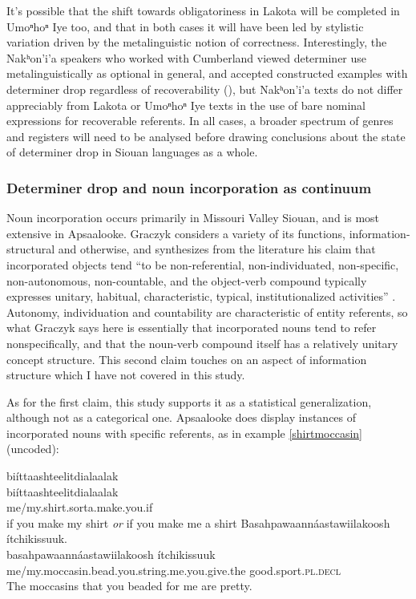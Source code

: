 \documentclass[output=paper]{LSP/langsci}
\begin{document}
	It’s possible that the shift towards obligatoriness in Lakota will be completed in Umoⁿhoⁿ Iye too, and that in both cases it will have been led by stylistic variation driven by the metalinguistic notion of correctness. Interestingly, the Nakʰon’i’a speakers who worked with Cumberland viewed determiner use metalinguistically as optional in general, and accepted constructed examples with determiner drop regardless of recoverability (\citealt[345]{Cumberland2005}), but Nakʰon’i’a texts do not differ appreciably from Lakota or Umoⁿhoⁿ Iye texts in the use of bare nominal expressions for recoverable referents. In all cases, a broader spectrum of genres and registers will need to be analysed before drawing conclusions about the state of determiner drop in Siouan languages as a whole.

\subsubsection{Determiner drop and noun incorporation as continuum}\label{dropincorp}

Noun incorporation occurs primarily in Missouri Valley Siouan, and is most extensive in Apsaalooke. Graczyk considers a variety of its functions, information-structural and otherwise, and synthesizes from the literature his claim that incorporated objects tend “to be non-referential, non-individuated, non-specific, non-autonomous, non-countable, and the object-verb compound typically expresses unitary, habitual, characteristic, typical, institutionalized activities” \citeyearpar[244]{Graczyk1991a}. Autonomy, individuation and countability are characteristic of entity referents, so what Graczyk says here is essentially that incorporated nouns tend to refer nonspecifically, and that the noun-verb compound itself has a relatively unitary concept structure. This second claim touches on an aspect of information structure which I have not covered in this study.

As for the first claim, this study supports it as a statistical generalization, although not as a categorical one. Apsaalooke does display instances of incorporated nouns with specific referents, as in example \ref{shirtmoccasin} (uncoded):

\ea\label{shirtmoccasin}
\ea\label{incorpshirt}
biíttaashteelitdialaalak\footnotemark\\
\gll	biíttaashteelitdialaalak\\
	me/my.shirt.sorta.make.you.if\\
\glt	if you make my shirt \emph{or} if you make me a shirt
\ex\label{incorpmoccasin}
Basahpawaannáastawiilakoosh ítchikissuuk.\footnotemark\\
\gll	basahpawaannáastawiilakoosh					ítchikissuuk\\
	me/my.moccasin.bead.you.string.me.you.give.the 		good.sport.\textsc{pl.decl}\\
\glt	The moccasins that you beaded for me are pretty. 
\z\z
\end{document}
